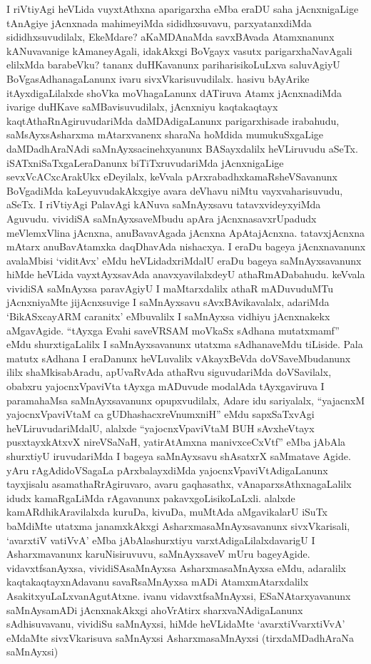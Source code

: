 \begin{artha}
I riVtiyAgi heVLida vuyxtAthxna aparigarxha eMba eraDU saha jAcnxnigaLige tAnAgiye jAcnxnada mahimeyiMda sididhxsuvavu, parxyatanxdiMda sididhxsuvudilalx, EkeMdare? aKaMDAnaMda savxBAvada Atamxnanunx kANuvavanige kAmaneyAgali, idakAkxgi BoVgayx vasutx parigarxhaNavAgali elilxMda barabeVku? tananx duHKavanunx pariharisikoLuLxva saluvAgiyU BoVgasAdhanagaLanunx ivaru sivxVkarisuvudilalx. hasivu bAyArike itAyxdigaLilalxde shoVka moVhagaLanunx dATiruva Atamx jAcnxnadiMda ivarige duHKave saMBavisuvudilalx, jAcnxniyu kaqtakaqtayx kaqtAthaRnAgiruvudariMda daMDAdigaLanunx parigarxhisade irabahudu, saMsAyxsAsharxma mAtarxvanenx sharaNa hoMdida mumukuSxgaLige daMDadhAraNAdi saMnAyxsacinehxyanunx BASayxdalilx heVLiruvudu aSeTx. iSATxniSaTxgaLeraDanunx biTiTxruvudariMda jAcnxnigaLige sevxVcACxcArakUkx eDeyilalx, keVvala pArxrabadhxkamaRsheVSavanunx BoVgadiMda kaLeyuvudakAkxgiye avara deVhavu niMtu vayxvaharisuvudu, aSeTx. I riVtiyAgi PalavAgi kANuva saMnAyxsavu tatavxvideyxyiMda Aguvudu. vividiSA saMnAyxsaveMbudu apAra jAcnxnasavxrUpadudx meVlemxVlina jAcnxna, anuBavavAgada jAcnxna ApAtajAcnxna. tatavxjAcnxna mAtarx anuBavAtamxka daqDhavAda nishacxya. I eraDu bageya jAcnxnavanunx avalaMbisi `viditAvx' eMdu heVLidadxriMdalU eraDu bageya saMnAyxsavanunx hiMde heVLida vayxtAyxsavAda anavxyavilalxdeyU athaRmADabahudu. keVvala vividiSA saMnAyxsa paravAgiyU I maMtarxdalilx athaR mADuvuduMTu \mdash  jAcnxniyaMte jijAcnxsuvige I saMnAyxsavu sAvxBAvikavalalx, adariMda `BikASxcayARM caranitx' eMbuvalilx I saMnAyxsa vidhiyu jAcnxnakekx aMgavAgide. ``tAyxga Evahi saveVRSAM moVkaSx sAdhana mutatxmamf'' eMdu shurxtigaLalilx I saMnAyxsavanunx utatxma sAdhanaveMdu tiLiside. Pala matutx sAdhana I eraDanunx heVLuvalilx vAkayxBeVda doVSaveMbudanunx ililx shaMkisabAradu, apUvaRvAda athaRvu siguvudariMda doVSavilalx, obabxru yajocnxVpaviVta tAyxga mADuvude modalAda tAyxgaviruva I paramahaMsa saMnAyxsavanunx opupxvudilalx, Adare idu sariyalalx, ``yajacnxM yajocnxVpaviVtaM ca gUDhashacxreVnumxniH'' eMdu sapxSaTxvAgi heVLiruvudariMdalU, alalxde ``yajocnxVpaviVtaM BUH sAvxheVtayx pusxtayxkAtxvX nireVSaNaH, yatirAtAmxna manivxceCxVtf'' eMba jAbAla shurxtiyU iruvudariMda I bageya saMnAyxsavu shAsatxrX saMmatave Agide. yAru rAgAdidoVSagaLa pArxbalayxdiMda yajocnxVpaviVtAdigaLanunx tayxjisalu asamathaRrAgiruvaro, avaru gaqhasathx, vAnaparxsAthxnagaLalilx idudx kamaRgaLiMda rAgavanunx pakavxgoLisikoLaLxli. alalxde kamARdhikAravilalxda kuruDa, kivuDa, muMtAda aMgavikalarU iSuTx baMdiMte utatxma janamxkAkxgi AsharxmasaMnAyxsavanunx sivxVkarisali, `avarxtiV vatiVvA' eMba jAbAlashurxtiyu varxtAdigaLilalxdavarigU I Asharxmavanunx karuNisiruvuvu, saMnAyxsaveV mUru bageyAgide. vidavxtfsanAyxsa, vividiSAsaMnAyxsa AsharxmasaMnAyxsa eMdu, adaralilx kaqtakaqtayxnAdavanu savaRsaMnAyxsa mADi AtamxmAtarxdalilx AsakitxyuLaLxvanAgutAtxne. ivanu vidavxtfsaMnAyxsi, ESaNAtarxyavanunx saMnAysamADi jAcnxnakAkxgi ahoVrAtirx sharxvaNAdigaLanunx sAdhisuvavanu, vividiSu saMnAyxsi, hiMde heVLidaMte `avarxtiVvarxtiVvA' eMdaMte sivxVkarisuva saMnAyxsi AsharxmasaMnAyxsi (tirxdaMDadhAraNa saMnAyxsi)
\end{artha}


